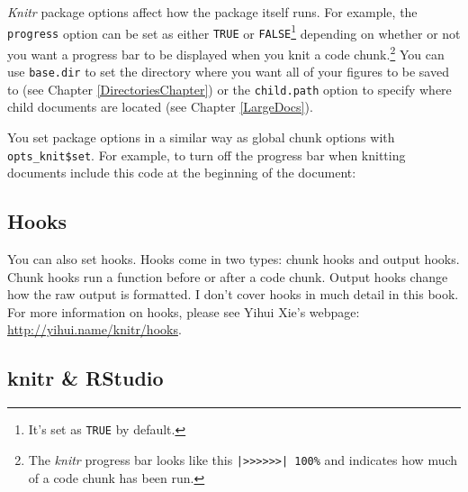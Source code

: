\documentclass[krantz1]{krantz}
\begin{document}
{\emph{Knitr}} package options affect how the package itself runs. For example, the {\tt{progress}} option can be set as either {\tt{TRUE}} or {\tt{FALSE}}\footnote{It's set as {\tt{TRUE}} by default.} depending on whether or not you want a progress bar to be displayed when you knit a code chunk.\footnote{The {\emph{knitr}} progress bar looks like this {\tt{|>>>>>>| 100\%}} and indicates how much of a code chunk has been run.} You can use {\tt{base.dir}} to set the directory where you want all of your figures to be saved to (see Chapter \ref{DirectoriesChapter}) or the {\tt{child.path}} option to specify where child documents are located (see Chapter \ref{LargeDocs}).

You set package options in a similar way as global chunk options with {\tt{opts\_knit\$set}}. For example, to turn off the progress bar when knitting documents include this code at the beginning of the document:

\begin{knitrout}
    \color{fgcolor}
\end{knitrout}


\subsection{Hooks}

You can also set hooks. Hooks come in two types: chunk hooks and output hooks. Chunk hooks run a function before or after a code chunk. Output hooks change how the raw output is formatted. I don't cover hooks in much detail in this book. For more information on hooks, please see Yihui Xie's webpage: \url{http://yihui.name/knitr/hooks}.

\subsection{knitr \& RStudio}
\end{document}
